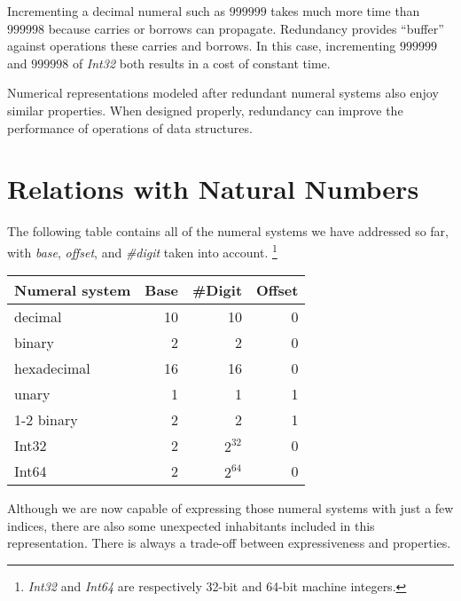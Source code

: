 \documentclass[\main/thesis.tex]{subfiles}
\begin{document}
Incrementing a decimal numeral such as $ 999999 $ takes much more time than
$ 999998 $ because carries or borrows can propagate.
Redundancy provides ``buffer'' against operations these carries and borrows.
In this case, incrementing $ 999999 $ and $ 999998 $ of \textit{Int32} both
results in a cost of constant time.


Numerical representations modeled after redundant numeral systems also enjoy
similar properties. When designed properly, redundancy can improve the performance
of operations of data structures.


\section{Relations with Natural Numbers}

The following table contains all of the numeral systems we have addressed so far,
with \textit{base}, \textit{offset}, and \textit{\#digit} taken into account.
\footnote{
\textit{Int32} and \textit{Int64} are respectively 32-bit and 64-bit machine
integers.
}

\begin{center}
    \begin{adjustbox}{max width=\textwidth}
    \begin{tabular}{ | l | r | r | r | }
    \textbf{Numeral system} & \textbf{Base} & \textbf{\#Digit} & \textbf{Offset} \\
    \hline
    decimal         & 10 & 10 & 0 \\
    binary          & 2  & 2  & 0 \\
    hexadecimal     & 16 & 16 & 0 \\
    unary           & 1  & 1  & 1 \\
    1-2 binary      & 2  & 2  & 1 \\
    Int32           & 2  & $ 2^{32} $ & 0 \\
    Int64           & 2  & $ 2^{64} $ & 0 \\
    \end{tabular}
    \end{adjustbox}
\end{center}

Although we are now capable of expressing those numeral systems with just a few
indices, there are also some unexpected inhabitants included in this representation.
There is always a trade-off between expressiveness and properties.
\end{document}
